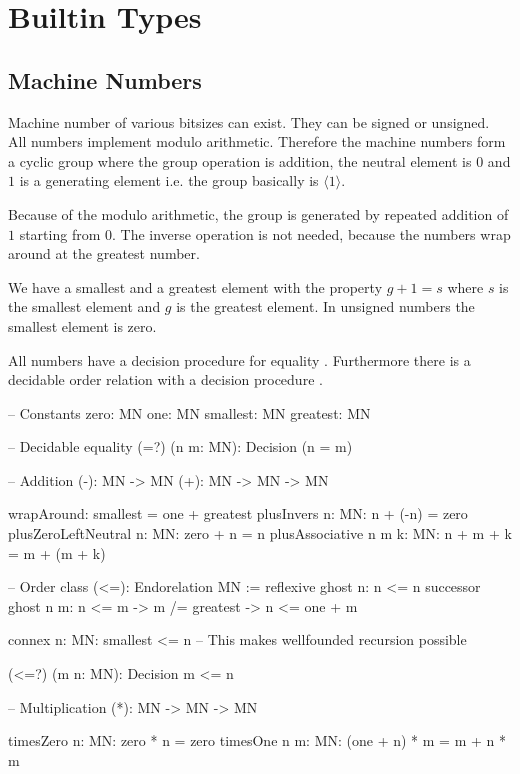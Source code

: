 \section{Builtin Types}

\subsection{Machine Numbers}

Machine number of various bitsizes can exist. They can be signed or unsigned.
All numbers implement modulo arithmetic. Therefore the machine numbers form a
cyclic group where the group operation is addition, the neutral element is $0$
and $1$ is a generating element i.e. the group basically is $\langle 1 \rangle$.

Because of the modulo arithmetic, the group is generated by repeated addition of
$1$ starting from $0$. The inverse operation is not needed, because the numbers
wrap around at the greatest number.

We have a smallest and a greatest element with the property $g + 1 = s$ where
$s$ is the smallest element and $g$ is the greatest element. In unsigned numbers
the smallest element is zero.

All numbers have a decision procedure for equality . Furthermore there
is a decidable order relation \code{<=} with a decision procedure .

\begin{alba}
    -- Constants
    zero: MN
    one:  MN
    smallest: MN
    greatest: MN

    -- Decidable equality
    (=?) (n m: MN): Decision (n = m)

    -- Addition
    (-): MN -> MN
    (+): MN -> MN -> MN

    wrapAround: smallest = one + greatest
    plusInvers {n: MN}: n + (-n) = zero
    plusZeroLeftNeutral {n: MN}:   zero + n = n
    plusAssociative  {n m k: MN}: n + m + k = m + (m + k)

    -- Order
    class
        (<=): Endorelation MN
    :=
        reflexive {ghost n}: n <= n
        successor {ghost n m}: n <= m -> m /= greatest -> n <= one + m

    connex {n: MN}: smallest <= n   -- This makes wellfounded recursion possible

    (<=?) (m n: MN): Decision m <= n


    -- Multiplication
    (*): MN -> MN -> MN

    timesZero {n: MN}:   zero * n = zero
    timesOne  {n m: MN}: (one + n) * m = m + n * m
\end{alba}

